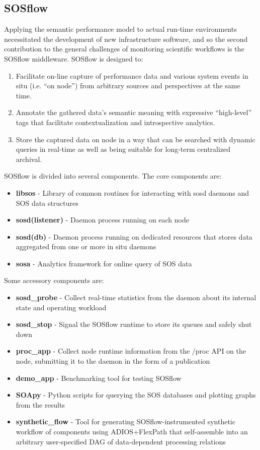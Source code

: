 
\subsection{SOSflow}
Applying the semantic performance model to actual
run-time environments necessitated the development of new
infrastructure software, and so the second contribution to the general
challenges of monitoring scientific workflows is the SOSflow middleware.
SOSflow is designed to:

\begin{enumerate}
\item Facilitate on-line capture of performance data and various system
  events in situ (i.e. ``on node'') from arbitrary sources and
  perspectives at the same time.
\item Annotate the gathered data's semantic meaning with expressive
  ``high-level'' tags that facilitate contextualization and
  introspective analytics.
\item Store the captured data on node in a way that can be searched
  with dynamic queries in real-time as well as being suitable for
  long-term centralized archival.
\end{enumerate}

SOSflow is divided into several components.  The core components are:
\begin{itemize}
\item \textbf{libsos} - Library of common routines for interacting with
      sosd daemons and SOS data structures
\item \textbf{sosd(listener)} - Daemon process running on each node
\item \textbf{sosd(db)} - Daemon process running on dedicated resources
      that stores data aggregated from one or more in situ daemons
\item \textbf{sosa} - Analytics framework for online query of SOS data
\end{itemize}

Some accessory components are:
\begin{itemize}
\item \textbf{sosd\_probe} - Collect real-time statistics from the daemon about
      its internal state and operating workload
\item \textbf{sosd\_stop} - Signal the SOSflow runtime to store its queues and
      safely shut down
\item \textbf{proc\_app} - Collect node runtime information from the /proc
      API on the node, submitting it to the daemon in the form of a publication
\item \textbf{demo\_app} - Benchmarking tool for testing SOSflow
\item \textbf{SOApy} - Python scripts for querying the SOS databases and plotting
      graphs from the results
\item \textbf{synthetic\_flow} - Tool for generating SOSflow-instrumented
      synthetic workflow of components using ADIOS+FlexPath
      that self-assemble into an arbitrary  user-specified DAG of
      data-dependent processing relations
\end{itemize}


